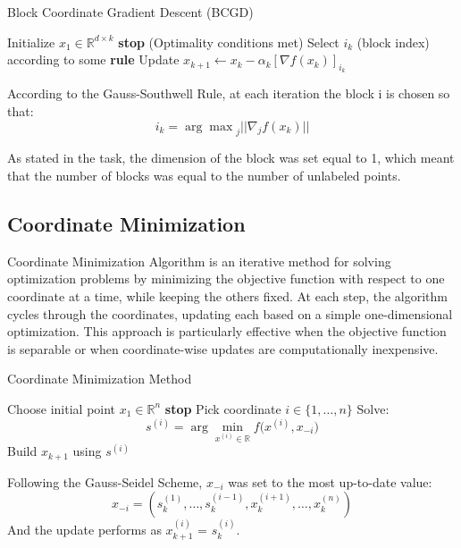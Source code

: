 \documentclass{article}
\begin{document}
\begin{algorithm}
\caption{Block Coordinate Gradient Descent (BCGD)}\label{alg:bcgd}
\begin{algorithmic}[1]
\State Initialize $x_1 \in \mathbb{R}^{d \times k}$
        \State \textbf{stop} (Optimality conditions met)
    \Else
        \State Select $i_k$ (block index) according to some \textbf{rule}
        \State Update $x_{k+1} \gets x_k - \alpha_k \left[\nabla f(x_k)\right]_{i_k}$
    \EndIf
\EndFor
\end{algorithmic}
\end{algorithm}
\noindent According to the Gauss-Southwell Rule, at each iteration the block i is chosen so that:
$$i_k = {\arg\max}_j ||\nabla_j f(x_k)||$$

\noindent As stated in the task, the dimension of the block was set equal to 1, which meant that the number of blocks was equal to the number of unlabeled points.
\subsection{Coordinate Minimization}
Coordinate Minimization Algorithm is an iterative method for solving optimization problems by minimizing the objective function with respect to one coordinate at a time, while keeping the others fixed. At each step, the algorithm cycles through the coordinates, updating each based on a simple one-dimensional optimization. This approach is particularly effective when the objective function is separable or when coordinate-wise updates are computationally inexpensive.
\begin{algorithm}
\caption{Coordinate Minimization Method}
\label{alg:coord_min}
\begin{algorithmic}[1]
\State Choose initial point $x_1 \in \mathbb{R}^n$
        \State \textbf{stop}
    \Else
    \State Pick coordinate $i \in \{1, \ldots, n\}$
    \State Solve: 
    \[
    s^{(i)} = \arg\min_{x^{(i)} \in \mathbb{R}} f\big(x^{(i)}, x_{-i}\big)
    \]
    \State Build $x_{k+1}$ using $s^{(i)}$
    \EndIf
\EndFor
\end{algorithmic}
\end{algorithm}

\noindent Following the Gauss-Seidel Scheme, $x_{-i}$ was set to the most up-to-date value:
\[
x_{-i} = (s_{k}^{(1)}, \ldots, s_{k}^{(i-1)}, x_{k}^{(i+1)}, \ldots, x_{k}^{(n)})
\]
And the update performs as $x_{k+1}^{(i)}$ = $s_{k}^{(i)}$.
\end{document}
